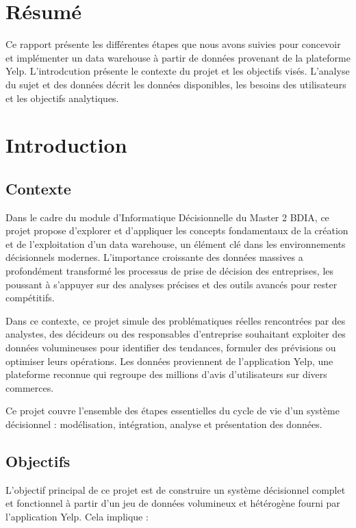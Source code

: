 \usepackage{graphicx}

\section*{Résumé}

Ce rapport présente les différentes étapes que nous avons suivies pour concevoir et implémenter un data warehouse à partir de données provenant de la plateforme Yelp.
L'introdcution présente le contexte du projet et les objectifs visés.
L'analyse du sujet et des données décrit les données disponibles, les besoins des utilisateurs et les objectifs analytiques.


\section*{Introduction}

\subsection{Contexte}\label{subsec:contexte}
Dans le cadre du module d’Informatique Décisionnelle du Master 2 BDIA, ce projet propose d’explorer et d’appliquer les concepts fondamentaux de la création et de l’exploitation d’un data warehouse, un élément clé dans les environnements décisionnels modernes. L’importance croissante des données massives a profondément transformé les processus de prise de décision des entreprises, les poussant à s’appuyer sur des analyses précises et des outils avancés pour rester compétitifs.

Dans ce contexte, ce projet simule des problématiques réelles rencontrées par des analystes, des décideurs ou des responsables d’entreprise souhaitant exploiter des données volumineuses pour identifier des tendances, formuler des prévisions ou optimiser leurs opérations. Les données proviennent de l’application Yelp, une plateforme reconnue qui regroupe des millions d’avis d’utilisateurs sur divers commerces. 

Ce projet couvre l’ensemble des étapes essentielles du cycle de vie d’un système décisionnel : modélisation, intégration, analyse et présentation des données.


\subsection*{Objectifs}
L’objectif principal de ce projet est de construire un système décisionnel complet et fonctionnel à partir d’un jeu de données volumineux et hétérogène fourni par l’application Yelp. Cela implique :

